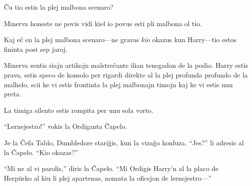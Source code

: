Ĉu tio estis la plej malbona scenaro?

Minerva honeste ne povis vidi kiel io povus esti pli malbona ol tio.

Kaj eĉ en la plej malbona scenaro—ne gravas \emph{kio} okazus kun
Harry—tio estos fininta post sep jaroj.

Minerva sentis siajn artikojn malstreĉante ilian tenegadon de la
podio. Harry estis prava, estis speco de konsolo per rigardi direkte
al la plej profunda profundo de la malhelo, scii ke vi estis frontinta
la plej malbonajn timojn kaj ke vi estis nun preta.

La timiga silento estis rompita per unu sola vorto.

``Lernejestro!'' vokis la Ordiganta Ĉapelo.

Je la Ĉefa Tablo, Dumbledore stariĝis, kun la vizaĝo konfuza. ``Jes?''
li adresis al la Ĉapelo. ``Kio okazas?''

``Mi ne al vi parolis,'' diris la Ĉapelo. ``Mi Ordigis Harry'n al la
placo de Herpŭrko al kiu li plej apartenas, nomata la oficejon de
lernejestro—''
